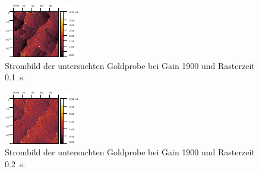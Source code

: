 \begin{figure}[H]
\centering
\includegraphics[width=\textwidth]{../Gwyddion/Gold/TIME_01_I_forward.pdf}
\caption{Strombild der untersuchten Goldprobe bei Gain 1900 und Rasterzeit \SI{0.1}{s}.}
\label{TIME_01_I}
\end{figure}

\begin{figure}[H]
\centering
\includegraphics[width=\textwidth]{../Gwyddion/Gold/TIME_02_I_forward.pdf}
\caption{Strombild der untersuchten Goldprobe bei Gain 1900 und Rasterzeit \SI{0.2}{s}.}
\label{TIME_02_I}
\end{figure}

